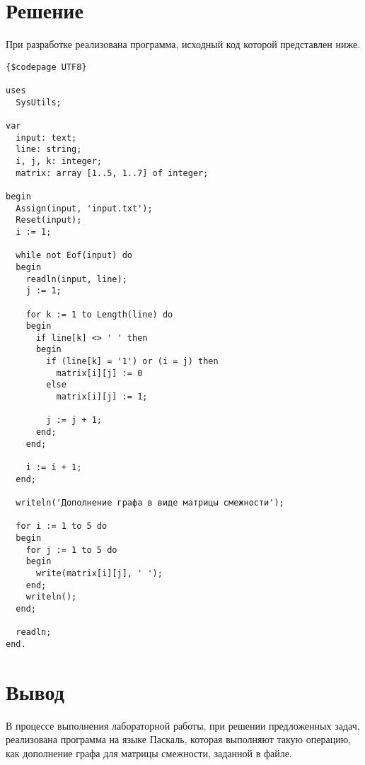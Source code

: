 \documentclass[a4paper,14pt]{extarticle}
\begin{document}
  \section*{Решение}

  При разработке реализована программа, исходный код которой представлен ниже.
  \begin{Verbatim}[tabsize=2]
{$codepage UTF8}

uses
  SysUtils;

var
  input: text;
  line: string;
  i, j, k: integer;
  matrix: array [1..5, 1..7] of integer;

begin
  Assign(input, 'input.txt');
  Reset(input);
  i := 1;

  while not Eof(input) do
  begin
    readln(input, line);
    j := 1;

    for k := 1 to Length(line) do
    begin
      if line[k] <> ' ' then
      begin
        if (line[k] = '1') or (i = j) then
          matrix[i][j] := 0
        else
          matrix[i][j] := 1;

        j := j + 1;
      end;
    end;

    i := i + 1;
  end;

  writeln('Дополнение графа в виде матрицы смежности');

  for i := 1 to 5 do
  begin
    for j := 1 to 5 do
    begin
      write(matrix[i][j], ' ');
    end;
    writeln();
  end;

  readln;
end.
  \end{Verbatim}

  \section*{Вывод}
  В процессе выполнения лабораторной работы, при решении предложенных задач, реализована программа на языке Паскаль, которая выполняют такую операцию, как дополнение графа для матрицы смежности, заданной в файле.
\end{document}
